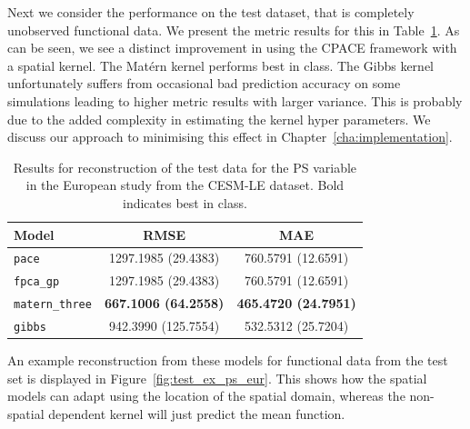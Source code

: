 Next we consider the performance on the test dataset, that is completely unobserved functional data.
We present the metric results for this in Table~\ref{tab:test_cesm_ps_eur}.
As can be seen, we see a distinct improvement in using the CPACE framework with a spatial kernel.
The Mat\'ern kernel performs best in class.
The Gibbs kernel unfortunately suffers from occasional bad prediction accuracy on some simulations leading to higher metric results with larger variance.
This is probably due to the added complexity in estimating the kernel hyper parameters.
We discuss our approach to minimising this effect in Chapter~\ref{cha:implementation}.

\begin{table}
	\caption[Results for PS variable on test data in the European study]{Results for reconstruction of the test data for the PS variable in the European study from the CESM-LE dataset. Bold indicates best in class.}
	\centering
	\label{tab:test_cesm_ps_eur}
	\begin{tabular}{lcc}
		\toprule
		\textbf{Model} & \textbf{RMSE} & \textbf{MAE} \\
		\midrule
		\verb*|pace| & 1297.1985 (29.4383) & 760.5791 (12.6591) \\
		\verb*|fpca_gp| & 1297.1985 (29.4383) & 760.5791 (12.6591) \\
		\verb*|matern_three| & \textbf{667.1006 (64.2558)}& \textbf{465.4720 (24.7951)}\\
		\verb*|gibbs| & 942.3990 (125.7554) & 532.5312 (25.7204)\\
		\bottomrule
	\end{tabular}
\end{table}

An example reconstruction from these models for functional data from the test set is displayed in Figure~\ref{fig:test_ex_ps_eur}. 
This shows how the spatial models can adapt using the location of the spatial domain, whereas the non-spatial dependent kernel will just predict the mean function.

